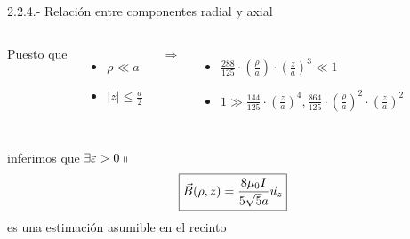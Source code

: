 \documentclass{beamer}
\makeatletter
\providecommand{\abs}[1]{\left|#1\right|}
\newcommand{\commentedbox}[2]{%
  \mbox{
    \begin{tabular}[t]{@{}c@{}}
    $\boxed{\displaystyle#1}$\\
    #2
    \end{tabular}%
  }%
}
\makeatother
\begin{document}
\begin{frame}{2.2.4.- Relación entre componentes radial y axial}
    \begin{columns}
          Puesto que\begin{itemize}
        \item $\rho \ll a$
        \item $\abs{z} \leq \frac{a}{2}$
        \end{itemize} \pause
          $\Longrightarrow$
          \begin{itemize}
        \item $\frac{288}{125} \cdot \left( \frac{\rho}{a} \right) \cdot \left( \frac{z}{a} \right)^{3} \ll 1 $
        \item $1 \gg \frac{144}{125} \cdot \left( \frac{z}{a} \right)^{4}, \frac{864}{125} \cdot \left( \frac{\rho}{a} \right)^{2} \cdot \left( \frac{z}{a} \right)^{2} $
        \end{itemize}
    \end{columns}
    \pause
    inferimos que $\exists \varepsilon > 0 \shortparallel$
    \begin{equation}
         \commentedbox{\vec{B}(\rho,z) = \frac{8 \mu_{0} I}{5 \sqrt{5} a} \vec{u}_{z}}{}\nonumber
    \end{equation}
    es una estimación asumible en el recinto  \vspace{-1.5cm}\begin{figure}

\end{figure}
\end{frame}
\end{document}
